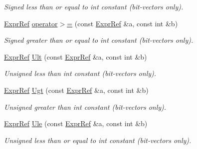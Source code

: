 \begin{DoxyCompactItemize}
\begin{DoxyCompactList}\small\item\em Signed less than or equal to int constant (bit-\/vectors only). \end{DoxyCompactList}\item 
\mbox{\label{namespaceilang_a603ea8347d245f1272a6a81b214d6395}} 
\mbox{\hyperlink{classilang_1_1_expr_ref}{Expr\+Ref}} \mbox{\hyperlink{namespaceilang_a603ea8347d245f1272a6a81b214d6395}{operator$>$=}} (const \mbox{\hyperlink{classilang_1_1_expr_ref}{Expr\+Ref}} \&a, const int \&b)
\begin{DoxyCompactList}\small\item\em Signed greater than or equal to int constant (bit-\/vectors only). \end{DoxyCompactList}\item 
\mbox{\label{namespaceilang_a1db90d2df4283f54d1cd7d54a45777ea}} 
\mbox{\hyperlink{classilang_1_1_expr_ref}{Expr\+Ref}} \mbox{\hyperlink{namespaceilang_a1db90d2df4283f54d1cd7d54a45777ea}{Ult}} (const \mbox{\hyperlink{classilang_1_1_expr_ref}{Expr\+Ref}} \&a, const int \&b)
\begin{DoxyCompactList}\small\item\em Unsigned less than int constant (bit-\/vectors only). \end{DoxyCompactList}\item 
\mbox{\label{namespaceilang_a79fdbef3ea0aac6693d4813bee367ad4}} 
\mbox{\hyperlink{classilang_1_1_expr_ref}{Expr\+Ref}} \mbox{\hyperlink{namespaceilang_a79fdbef3ea0aac6693d4813bee367ad4}{Ugt}} (const \mbox{\hyperlink{classilang_1_1_expr_ref}{Expr\+Ref}} \&a, const int \&b)
\begin{DoxyCompactList}\small\item\em Unsigned greater than int constant (bit-\/vectors only). \end{DoxyCompactList}\item 
\mbox{\label{namespaceilang_a5e2bc76f04057367f87de947e733a897}} 
\mbox{\hyperlink{classilang_1_1_expr_ref}{Expr\+Ref}} \mbox{\hyperlink{namespaceilang_a5e2bc76f04057367f87de947e733a897}{Ule}} (const \mbox{\hyperlink{classilang_1_1_expr_ref}{Expr\+Ref}} \&a, const int \&b)
\begin{DoxyCompactList}\small\item\em Unsigned less than or equal to int constant (bit-\/vectors only). \end{DoxyCompactList}\item 

\end{DoxyCompactItemize}
